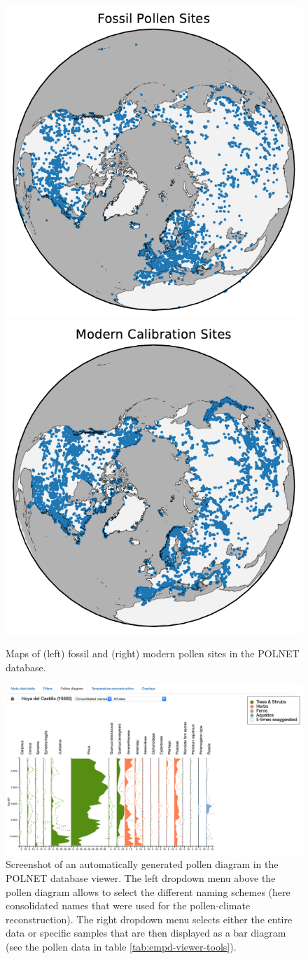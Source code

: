 \documentclass[
11pt, %
english, %
singlespacing, %
headsepline, %
]{MastersDoctoralThesis} %
\begin{document}
\begin{NoHyper}
\begin{refsection}
\begin{figure}
	\centering
	\includegraphics[width=0.45\linewidth]{empd-figures/fossil-sites.pdf}
	\includegraphics[width=0.45\linewidth]{empd-figures/modern-sites.pdf}
	\caption[Map of sites in the POLNET database]{Maps of (left) fossil and (right) modern pollen sites in the POLNET database.}
	\label{fig:polnet-sites}
\end{figure}

\begin{figure}[h]
	\includegraphics[width=\linewidth]{empd-figures/polnet-diagram.png}
	\caption{Screenshot of an automatically generated pollen diagram in the POLNET database viewer. The left dropdown menu above the pollen diagram allows to select the different naming schemes (here consolidated names that were used for the pollen-climate reconstruction). The right dropdown menu selects either the entire data or specific samples that are then displayed as a bar diagram (see the pollen data in table \ref{tab:empd-viewer-tools}).}
	\label{fig:polnet-pollen-diagram}
\end{figure}


\end{refsection}
\end{NoHyper}
\end{document}
